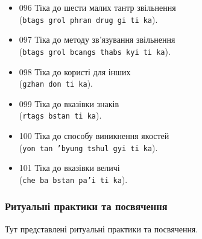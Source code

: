 \documentclass{article}
\begin{document}
\begin{itemize}
\item 096 Тіка до шести малих тантр звільнення \\ (\texttt{btags grol phran drug gi ti ka}).
\item 097 Тіка до методу зв'язування звільнення \\ (\texttt{btags grol bcangs thabs kyi ti ka}).
\item 098 Тіка до користі для інших \\ (\texttt{gzhan don ti ka}).
\item 099 Тіка до вказівки знаків \\ (\texttt{rtags bstan ti ka}).
\item 100 Тіка до способу виникнення якостей \\ (\texttt{yon tan 'byung tshul gyi ti ka}).
\item 101 Тіка до вказівки величі \\ (\texttt{che ba bstan pa'i ti ka}).
\end{itemize}
\endgroup

\subsubsection{Ритуальні практики та посвячення}

Тут представлені ритуальні практики та посвячення.
\end{document}
